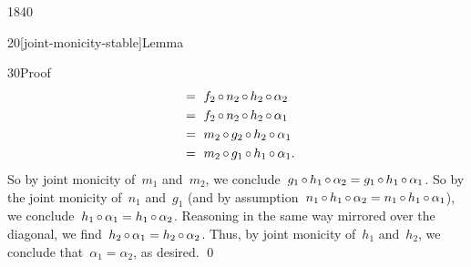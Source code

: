 \begin{parsec}{1840}
\begin{point}{20}[joint-monicity-stable]{Lemma}
\begin{point}{30}{Proof}
\begin{align*}
    &\ =\  f_2 \mathop{\circ} n_2 \mathop{\circ} h_2 \mathop{\circ} \alpha_2 \\ 
    &\ =\  f_2 \mathop{\circ} n_2 \mathop{\circ} h_2 \mathop{\circ} \alpha_1 \\ 
    &\ =\  m_2 \mathop{\circ} g_2 \mathop{\circ} h_2 \mathop{\circ} \alpha_1 \\ 
    &\ =\  m_2 \mathop{\circ} g_1 \mathop{\circ} h_1 \mathop{\circ} \alpha_1.
\end{align*}
So by joint monicity of~$m_1$ and~$m_2$,
    we conclude~$g_1 \mathop{\circ} h_1 \mathop{\circ} \alpha_2
                = g_1 \mathop{\circ} h_1 \mathop{\circ} \alpha_1$.
So by the joint monicity of~$n_1$ and~$g_1$
    (and by assumption~$n_1 \mathop{\circ} h_1 \mathop{\circ} \alpha_2
    = n_1 \mathop{\circ} h_1 \mathop{\circ} \alpha_1$),
    we conclude~$h_1 \mathop{\circ} \alpha_1 = h_1 \mathop{\circ} \alpha_2$.
Reasoning in the same way mirrored over the diagonal,
    we find~$h_2 \mathop{\circ} \alpha_1 = h_2 \mathop{\circ} \alpha_2$.
Thus, by joint monicity of~$h_1$ and~$h_2$, we conclude that~$\alpha_1 = \alpha_2$, as desired. \qed
\end{point}
\end{point}
\end{parsec}


